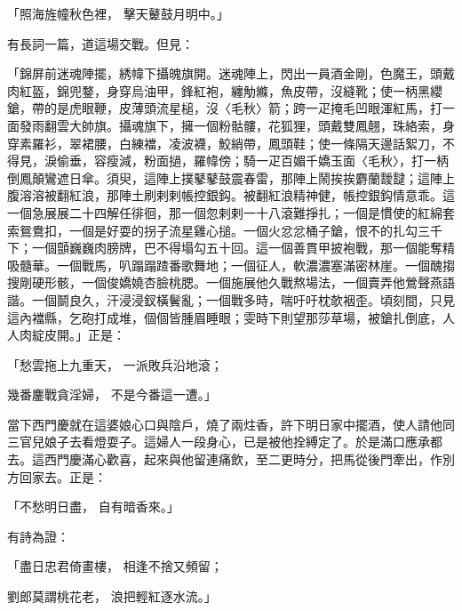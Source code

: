 「照海旌幢秋色裡，  擊天鼙鼓月明中。」

有長詞一篇，道這場交戰。但見：

「錦屏前迷魂陣擺，綉幃下攝魄旗開。迷魂陣上，閃出一員酒金剛，色魔王，頭戴肉紅盔，錦兜鍪，身穿烏油甲，鋒紅袍，纏觔縧，魚皮帶，沒縫靴；使一柄黑纓鎗，帶的是虎眼鞭，皮薄頭流星槌，沒〈毛秋〉箭；跨一疋掩毛凹眼渾紅馬，打一面發雨翻雲大帥旗。攝魂旗下，擁一個粉骷髏，花狐狸，頭戴雙鳳翹，珠絡索，身穿素羅衫，翠裙腰，白練襠，凌波襪，鮫綃帶，鳳頭鞋；使一條隔天邊話絮刀，不得見，淚偷垂，容瘦減，粉面撾，羅幃傍；騎一疋百媚千嬌玉面〈毛秋〉，打一柄倒鳳顛鸞遮日傘。須臾，這陣上撲鼕鼕鼓震春雷，那陣上鬧挨挨麝蘭靉靆；這陣上腹溶溶被翻紅浪，那陣土刷剌剌帳控銀鈎。被翻紅浪精神健，帳控銀鈎情意乖。這一個急展展二十四解任徘徊，那一個忽剌剌一十八滾難掙扎；一個是慣使的紅綿套索鴛鴦扣，一個是好耍的拐子流星雞心搥。一個火忿忿桶子鎗，恨不的扎勾三千下；一個顫巍巍肉膀牌，巴不得塌勾五十回。這一個善貫甲披袍戰，那一個能奪精吸髓華。一個戰馬，叭蹋蹋蹅番歌舞地；一個征人，軟濃濃塞滿密林崖。一個醜搊搜剛硬形骸，一個俊嬌嬈杏臉桃腮。一個施展他久戰熬場法，一個賣弄他鶯聲燕語諧。一個鬬良久，汗浸浸釵橫鬢亂；一個戰多時，喘吁吁枕欹裀歪。頃刻間，只見這內襠縣，乞砲打成堆，個個皆腫眉睡眼；雯時下則望那莎草場，被鎗扎倒底，人人肉綻皮開。」正是：

「愁雲拖上九重天，  一派敗兵沿地滾；

幾番鏖戰貪淫婦，  不是今番這一遭。」

當下西門慶就在這婆娘心口與陰戶，燒了兩炷香，許下明日家中擺酒，使人請他同三官兒娘子去看燈耍子。這婦人一段身心，已是被他拴縛定了。於是滿口應承都去。這西門慶滿心歡喜，起來與他留連痛飲，至二更時分，把馬從後門牽出，作別方回家去。正是：

「不愁明日盡，  自有暗香來。」

有詩為證：

「盡日忠君倚畫樓，  相逢不捨又頻留；

劉郎莫謂桃花老，  浪把輕紅逐水流。」

